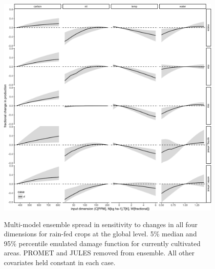 \documentclass[10pt]{article}
\begin{document}
\begin{figure}[h!]
\includegraphics[width=\textwidth]{em_CTWN_all_crops.png}\\
\caption{Multi-model ensemble spread in sensitivity to changes in all four dimensions for rain-fed crops at the global level. 5\% median and 95\% percentile emulated damage function for currently cultivated areas. PROMET and JULES removed from ensemble. All other covariates held constant in each case.}
\label{fig:all_dims}
\end{figure}
\end{document}
